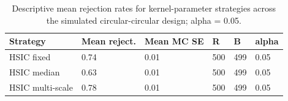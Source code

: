 \begin{table}[!htbp]
\centering
\scriptsize
\caption{Descriptive mean rejection rates for kernel-parameter strategies across the simulated circular-circular design; alpha = 0.05.}
\label{tab:strategy}
\begin{tabular}{llllll}
\toprule
Strategy & Mean reject. & Mean MC SE & R & B & alpha
\\
\midrule
HSIC fixed & 0.74 & 0.01 & 500 & 499 & 0.05\\
HSIC median & 0.63 & 0.01 & 500 & 499 & 0.05\\
HSIC multi-scale & 0.78 & 0.01 & 500 & 499 & 0.05\\
\bottomrule
\end{tabular}
\end{table}
